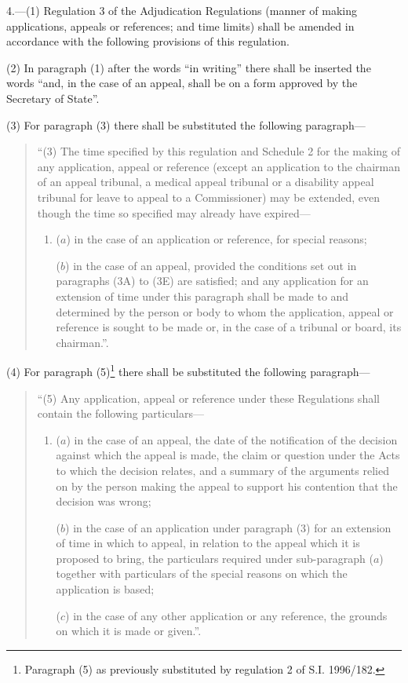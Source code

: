 \documentclass[a4paper]{article}
\begin{document}
4.—(1) Regulation 3 of the Adjudication Regulations (manner of making applications, appeals or references; and time limits) shall be amended in accordance with the following provisions of this regulation.

(2) In paragraph (1) after the words “in writing” there shall be inserted the words “and, in the case of an appeal, shall be on a form approved by the Secretary of State”.

(3) For paragraph (3) there shall be substituted the following paragraph—
\begin{quotation}
“(3) The time specified by this regulation and Schedule 2 for the making of any application, appeal or reference (except an application to the chairman of an appeal tribunal, a medical appeal tribunal or a disability appeal tribunal for leave to appeal to a Commissioner) may be extended, even though the time so specified may already have expired—
\begin{enumerate}\item[]
($a$) in the case of an application or reference, for special reasons;

($b$) in the case of an appeal, provided the conditions set out in paragraphs (3A) to (3E) are satisfied; and any application for an extension of time under this paragraph shall be made to and determined by the person or body to whom the application, appeal or reference is sought to be made or, in the case of a tribunal or board, its chairman.”.
\end{enumerate}
\end{quotation}

(4) For paragraph (5)\footnote{\frenchspacing Paragraph (5) as previously substituted by regulation 2 of S.I. 1996/182.} there shall be substituted the following paragraph—
\begin{quotation}
“(5) Any application, appeal or reference under these Regulations shall contain the following particulars—
\begin{enumerate}\item[]
($a$) in the case of an appeal, the date of the notification of the decision against which the appeal is made, the claim or question under the Acts to which the decision relates, and a summary of the arguments relied on by the person making the appeal to support his contention that the decision was wrong;

($b$) in the case of an application under paragraph (3) for an extension of time in which to appeal, in relation to the appeal which it is proposed to bring, the particulars required under sub-paragraph ($a$) together with particulars of the special reasons on which the application is based;

($c$) in the case of any other application or any reference, the grounds on which it is made or given.”.
\end{enumerate}
\end{quotation}
\end{document}
